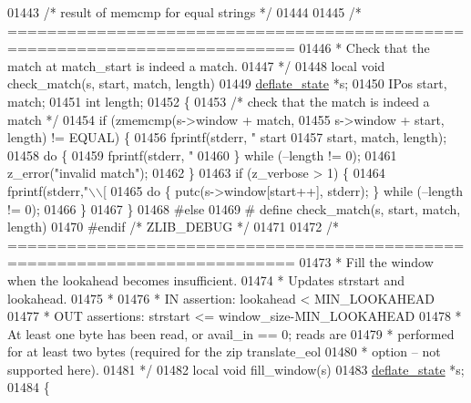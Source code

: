 \begin{DoxyCode}
{01443 \textcolor{comment}{/* result of memcmp for equal strings */}
01444 
01445 \textcolor{comment}{/* ===========================================================================}
01446 \textcolor{comment}{ * Check that the match at match\_start is indeed a match.}
01447 \textcolor{comment}{ */}
01448 local \textcolor{keywordtype}{void} check\_match(s, start, match, length)
01449     \hyperlink{structinternal__state}{deflate\_state} *s;
01450     IPos start, match;
01451     \textcolor{keywordtype}{int} length;
01452 \{
01453     \textcolor{comment}{/* check that the match is indeed a match */}
01454     \textcolor{keywordflow}{if} (zmemcmp(s->window + match,
01455                 s->window + start, length) != EQUAL) \{
01456         fprintf(stderr, \textcolor{stringliteral}{" start %
01457                 start, match, length);
01458         \textcolor{keywordflow}{do} \{
01459             fprintf(stderr, \textcolor{stringliteral}{"%
01460         \} \textcolor{keywordflow}{while} (--length != 0);
01461         z\_error(\textcolor{stringliteral}{"invalid match"});
01462     \}
01463     \textcolor{keywordflow}{if} (z\_verbose > 1) \{
01464         fprintf(stderr,\textcolor{stringliteral}{"\(\backslash\)\(\backslash\)[%
01465         \textcolor{keywordflow}{do} \{ putc(s->window[start++], stderr); \} \textcolor{keywordflow}{while} (--length != 0);
01466     \}
01467 \}
01468 \textcolor{preprocessor}{#else}
01469 \textcolor{preprocessor}{#  define check\_match(s, start, match, length)}
01470 \textcolor{preprocessor}{#endif }\textcolor{comment}{/* ZLIB\_DEBUG */}\textcolor{preprocessor}{}
01471 
01472 \textcolor{comment}{/* ===========================================================================}
01473 \textcolor{comment}{ * Fill the window when the lookahead becomes insufficient.}
01474 \textcolor{comment}{ * Updates strstart and lookahead.}
01475 \textcolor{comment}{ *}
01476 \textcolor{comment}{ * IN assertion: lookahead < MIN\_LOOKAHEAD}
01477 \textcolor{comment}{ * OUT assertions: strstart <= window\_size-MIN\_LOOKAHEAD}
01478 \textcolor{comment}{ *    At least one byte has been read, or avail\_in == 0; reads are}
01479 \textcolor{comment}{ *    performed for at least two bytes (required for the zip translate\_eol}
01480 \textcolor{comment}{ *    option -- not supported here).}
01481 \textcolor{comment}{ */}
01482 local \textcolor{keywordtype}{void} fill\_window(s)
01483     \hyperlink{structinternal__state}{deflate\_state} *s;
01484 \{
}}}}
\end{DoxyCode}
